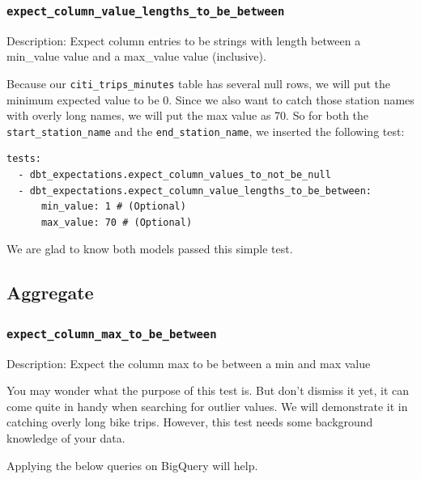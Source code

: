 \documentclass[
]{book}
\begin{document}
\hypertarget{expect_column_value_lengths_to_be_between}{%
\subsubsection{\texorpdfstring{\texttt{expect\_column\_value\_lengths\_to\_be\_between}}{expect\_column\_value\_lengths\_to\_be\_between}}\label{expect_column_value_lengths_to_be_between}}

Description: Expect column entries to be strings with length between a min\_value value and a max\_value value (inclusive).

Because our \texttt{citi\_trips\_minutes} table has several null rows, we will put the minimum expected value to be 0. Since we also want to catch those station names with overly long names, we will put the max value as 70. So for both the \texttt{start\_station\_name} and the \texttt{end\_station\_name}, we inserted the following test:

\begin{verbatim}
tests:
  - dbt_expectations.expect_column_values_to_not_be_null
  - dbt_expectations.expect_column_value_lengths_to_be_between:
      min_value: 1 # (Optional)
      max_value: 70 # (Optional)
\end{verbatim}

We are glad to know both models passed this simple test.

\hypertarget{aggregate}{%
\subsection{Aggregate}\label{aggregate}}

\hypertarget{expect_column_max_to_be_between}{%
\subsubsection{\texorpdfstring{\texttt{expect\_column\_max\_to\_be\_between}}{expect\_column\_max\_to\_be\_between}}\label{expect_column_max_to_be_between}}

Description: Expect the column max to be between a min and max value

You may wonder what the purpose of this test is. But don't dismiss it yet, it can come quite in handy when searching for outlier values. We will demonstrate it in catching overly long bike trips. However, this test needs some background knowledge of your data.

Applying the below queries on BigQuery will help.
\end{document}
